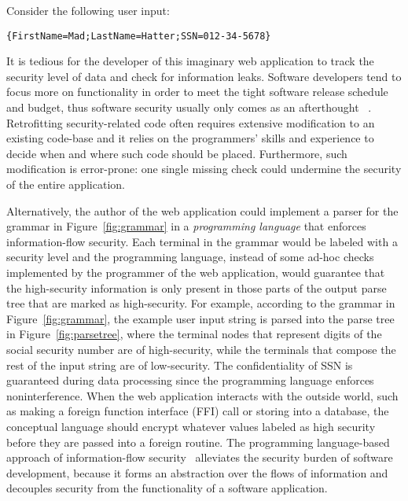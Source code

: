 Consider the following user input:

\begin{lstlisting}[numbers=none,xleftmargin=0.1\textwidth]
{FirstName=Mad;LastName=Hatter;SSN=012-34-5678}
\end{lstlisting}

It is tedious for the developer of this imaginary web application
to track the security level of data and check for information leaks.
Software developers tend to focus more on functionality
in order to meet the tight software release schedule and budget,
thus software security usually only comes as an afterthought
~\parencite{assal2018security,sharma2017aspects,steward2012software}.
Retrofitting security-related code often requires extensive modification to
an existing code-base and it relies on the programmers' skills
and experience to decide when and where such code should be placed.
Furthermore, such modification is error-prone: one single missing
check could undermine the security of the entire application.

Alternatively, the author of the web application could implement
a parser for the grammar in Figure~\ref{fig:grammar} in
a \textit{programming language} that enforces information-flow security.
Each terminal in the grammar would be labeled with a security level and
the programming language, instead of some ad-hoc checks implemented by
the programmer of the web application, would guarantee that
the high-security information is only present in those parts of
the output parse tree that are marked as high-security.
For example, according to the grammar in Figure~\ref{fig:grammar},
the example user input string is parsed into the parse tree in
Figure~\ref{fig:parsetree}, where the terminal nodes that represent digits of
the social security number are of {\color{red} high-security},
while the terminals that compose the rest of the input string are of
{\color{green} low-security}.  The confidentiality of SSN is guaranteed
during data processing since the programming language enforces
noninterference. When the web application interacts with the outside
world, such as making a foreign function interface (FFI) call
or storing into a database, the conceptual language should encrypt
whatever values labeled as high security before they are passed into a
foreign routine. The programming language-based approach of
information-flow security~\parencite{sabelfeld2003language}
alleviates the security burden of software development,
because it forms an abstraction over the flows of information and
decouples security from the functionality of a software application.

